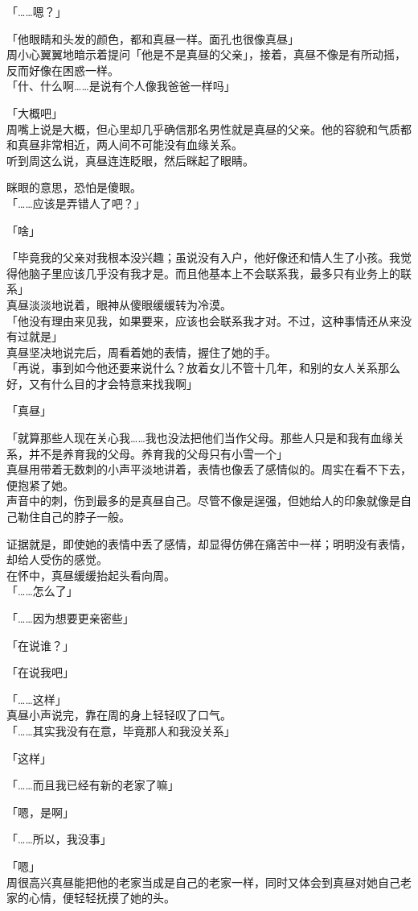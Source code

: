 「……嗯？」

「他眼睛和头发的颜色，都和真昼一样。面孔也很像真昼」\\

周小心翼翼地暗示着提问「他是不是真昼的父亲」，接着，真昼不像是有所动摇，反而好像在困惑一样。\\

「什、什么啊……是说有个人像我爸爸一样吗」

「大概吧」\\

周嘴上说是大概，但心里却几乎确信那名男性就是真昼的父亲。他的容貌和气质都和真昼非常相近，两人间不可能没有血缘关系。\\

听到周这么说，真昼连连眨眼，然后眯起了眼睛。

眯眼的意思，恐怕是傻眼。\\

「……应该是弄错人了吧？」

「啥」

「毕竟我的父亲对我根本没兴趣；虽说没有入户，他好像还和情人生了小孩。我觉得他脑子里应该几乎没有我才是。而且他基本上不会联系我，最多只有业务上的联系」\\

真昼淡淡地说着，眼神从傻眼缓缓转为冷漠。\\

「他没有理由来见我，如果要来，应该也会联系我才对。不过，这种事情还从来没有过就是」\\

真昼坚决地说完后，周看着她的表情，握住了她的手。\\

「再说，事到如今他还要来说什么？放着女儿不管十几年，和别的女人关系那么好，又有什么目的才会特意来找我啊」

「真昼」

「就算那些人现在关心我……我也没法把他们当作父母。那些人只是和我有血缘关系，并不是养育我的父母。养育我的父母只有小雪一个」\\

真昼用带着无数刺的小声平淡地讲着，表情也像丢了感情似的。周实在看不下去，便抱紧了她。\\

声音中的刺，伤到最多的是真昼自己。尽管不像是逞强，但她给人的印象就像是自己勒住自己的脖子一般。

证据就是，即使她的表情中丢了感情，却显得仿佛在痛苦中一样；明明没有表情，却给人受伤的感觉。\\

在怀中，真昼缓缓抬起头看向周。\\

「……怎么了」

「……因为想要更亲密些」

「在说谁？」

「在说我吧」

「……这样」\\

真昼小声说完，靠在周的身上轻轻叹了口气。\\

「……其实我没有在意，毕竟那人和我没关系」

「这样」

「……而且我已经有新的老家了嘛」

「嗯，是啊」

「……所以，我没事」

「嗯」\\

周很高兴真昼能把他的老家当成是自己的老家一样，同时又体会到真昼对她自己老家的心情，便轻轻抚摸了她的头。
